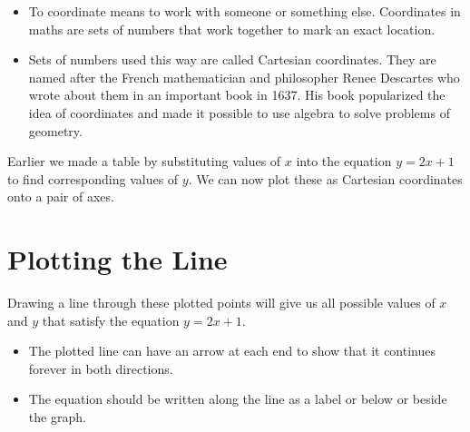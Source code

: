 \documentclass[12pt]{article}
\begin{document}
\begin{itemize}
    \item To coordinate means to work with someone or something else. Coordinates in maths are sets of numbers that work together to mark an exact location.
    \item Sets of numbers used this way are called Cartesian coordinates. They are named after the French mathematician and philosopher Renee Descartes who wrote about them in an important book in 1637. His book popularized the idea of coordinates and made it possible to use algebra to solve problems of geometry.
\end{itemize}

Earlier we made a table by substituting values of \( x \) into the equation \( y = 2x + 1 \)to find corresponding values of \( y \). We can now plot these as Cartesian coordinates onto a pair of axes.

\begin{center}
\end{center}

\newpage

\section*{Plotting the Line}

Drawing a line through these plotted points will give us all possible values of $x$ and $y$ that satisfy the equation $y=2x+1$.

\begin{itemize}
    \item The plotted line can have an arrow at each end to show that it continues forever in both directions.
    \item The equation should be written along the line as a label or below or beside the graph.
\end{itemize}
\end{document}
